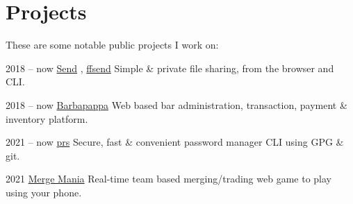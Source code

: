 \documentclass[]{cv-timvisee}
\begin{document}

\section{Projects}

These are some notable public projects I work on:

\begin{entrylist}

\entry
{2018 -- now}
{\href{https://github.com/timvisee/send}{Send} , \href{https://github.com/timvisee/ffsend}{ffsend}}
{}
{Simple \& private file sharing, from the browser and CLI.}

\entry
{2018 -- now}
{\href{https://github.com/timvisee/barbapappa}{Barbapappa}}
{}
{Web based bar administration, transaction, payment \& inventory platform.}

\entry
{2021 -- now}
{\href{https://github.com/timvisee/prs}{prs}}
{}
{Secure, fast \& convenient password manager CLI using GPG \& git.}

\entry
{2021}
{\href{https://github.com/timvisee/merge-mania}{Merge Mania}}
{}
{Real-time team based merging/trading web game to play using your phone.}







\end{entrylist}
\end{document}
